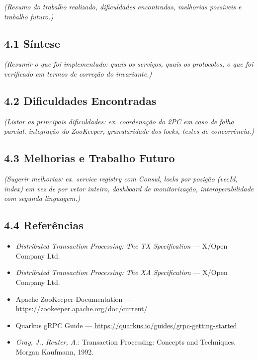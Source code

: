 
\textit{(Resumo do trabalho realizado, dificuldades encontradas, melhorias possíveis e trabalho futuro.)}

\subsection*{4.1 Síntese}

\textit{(Resumir o que foi implementado: quais os serviços, quais os protocolos, o que foi verificado em termos de correção do invariante.)}

\subsection*{4.2 Dificuldades Encontradas}

\textit{(Listar as principais dificuldades: ex. coordenação do 2PC em caso de falha parcial, integração do ZooKeeper, granularidade dos locks, testes de concorrência.)}

\subsection*{4.3 Melhorias e Trabalho Futuro}

\textit{(Sugerir melhorias: ex. service registry com Consul, locks por posição (vecId, index) em vez de por vetor inteiro, dashboard de monitorização, interoperabilidade com segunda linguagem.)}

\subsection*{4.4 Referências}

\begin{itemize}
  \item \textit{Distributed Transaction Processing: The TX Specification} — X/Open Company Ltd.
  \item \textit{Distributed Transaction Processing: The XA Specification} — X/Open Company Ltd.
  \item Apache ZooKeeper Documentation --- \url{https://zookeeper.apache.org/doc/current/}
  \item Quarkus gRPC Guide --- \url{https://quarkus.io/guides/grpc-getting-started}
  \item \textit{Gray, J., Reuter, A.}: Transaction Processing: Concepts and Techniques. Morgan Kaufmann, 1992.
\end{itemize}

